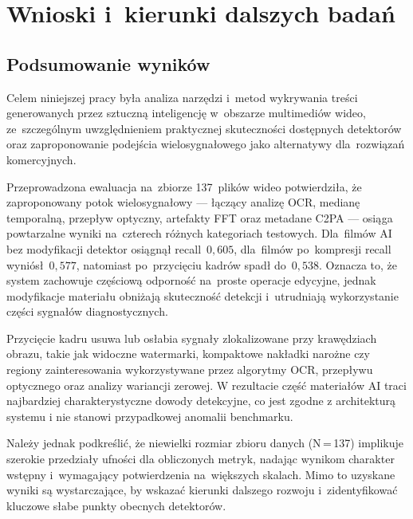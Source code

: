 \chapter{Wnioski i~kierunki dalszych bada\'{n}}
\label{chap:wnioski}

\section{Podsumowanie wynik\'{o}w}

Celem niniejszej pracy by\l{}a analiza narz\k{e}dzi i~metod wykrywania tre\'{s}ci
generowanych przez sztuczn\k{a} inteligencj\k{e} w~obszarze multimedi\'{o}w wideo,
ze~szczeg\'{o}lnym uwzgl\k{e}dnieniem praktycznej skuteczno\'{s}ci dost\k{e}pnych detektor\'{o}w
oraz zaproponowanie podej\'{s}cia wielosygna\l{}owego jako alternatywy dla~rozwi\k{a}za\'{n}
komercyjnych.

Przeprowadzona ewaluacja na~zbiorze 137~plik\'{o}w wideo potwierdzi\l{}a,
\.{z}e zaproponowany potok wielosygna\l{}owy --- \l{}\k{a}cz\k{a}cy analiz\k{e} OCR,
median\k{e} temporaln\k{a}, przep\l{}yw optyczny, artefakty FFT
oraz metadane C2PA --- osi\k{a}ga powtarzalne wyniki na~czterech r\'{o}\.{z}nych
kategoriach testowych. Dla~film\'{o}w AI bez modyfikacji detektor osi\k{a}gn\k{a}\l{}
recall~$0{,}605$, dla~film\'{o}w po~kompresji recall wyniósł~$0{,}577$,
natomiast po~przyci\k{e}ciu kadr\'{o}w spad\l{} do~$0{,}538$. Oznacza to, \.{z}e system
zachowuje cz\k{e}\'{s}ciow\k{a} odporno\'{s}\'{c} na~proste operacje edycyjne, jednak
modyfikacje materia\l{}u obni\.{z}aj\k{a} skuteczno\'{s}\'{c} detekcji i~utrudniaj\k{a}
wykorzystanie cz\k{e}\'{s}ci sygna\l{}\'{o}w diagnostycznych.

Przycięcie kadru usuwa lub osłabia sygnały zlokalizowane przy krawędziach obrazu,
takie jak widoczne watermarki, kompaktowe nakładki narożne czy regiony zainteresowania
wykorzystywane przez algorytmy OCR, przepływu optycznego oraz analizy wariancji zerowej.
W rezultacie część materiałów AI traci najbardziej charakterystyczne dowody detekcyjne,
co jest zgodne z architekturą systemu i nie stanowi przypadkowej anomalii benchmarku.

Należy jednak podkreślić, że niewielki rozmiar zbioru danych (N\,=\,137)
implikuje szerokie przedziały ufności dla obliczonych metryk, nadając wynikom
charakter wstępny i~wymagający potwierdzenia na~większych skalach.
Mimo to uzyskane wyniki są wystarczające, by wskazać kierunki dalszego rozwoju
i~zidentyfikować kluczowe słabe punkty obecnych detektorów.

